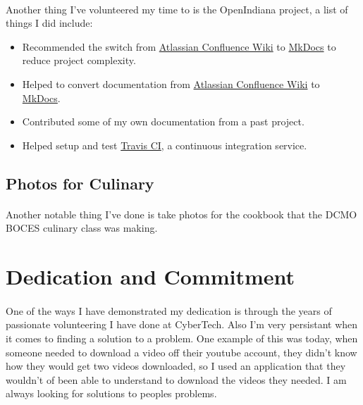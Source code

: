 \paragraph{}
Another thing I've volunteered my time to is the OpenIndiana project, a list of
things I did include:
\par


\begin{itemize}
	\item{Recommended the switch from \href{https://www.atlassian.com/software/confluence}{Atlassian Confluence Wiki} to \href{http://www.mkdocs.org/}{MkDocs} to reduce project complexity.}
	\item {Helped to convert documentation from \href{https://www.atlassian.com/software/confluence}{Atlassian Confluence Wiki} to \href{http://www.mkdocs.org/}{MkDocs}.}
	\item {Contributed some of my own documentation from a past project.}
	\item {Helped setup and test \href{https://travis-ci.org/}{Travis CI}, a continuous integration service.}
\end{itemize}

\subsection{Photos for Culinary}
\paragraph{}
Another notable thing I've done is take photos for the cookbook that the DCMO
BOCES culinary class was making.
\par

\section{Dedication and Commitment}
\paragraph{}
One of the ways I have demonstrated my dedication is through the years of
passionate volunteering I have done at CyberTech. Also I'm very persistant
when it comes to finding a solution to a problem. One example of this was
today, when someone needed to download a video off their youtube account, they
didn't know how they would get two videos downloaded, so I used an application
that they wouldn't of been able to understand to download the videos they
needed. I am always looking for solutions to peoples problems.
\par
